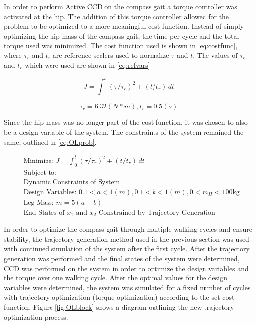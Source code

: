 \documentclass{./springer/svjour3}
\begin{document}
In order to perform Active CCD on the compass gait a torque controller was activated at the hip. The addition of this torque controller allowed
for the problem to be optimized to a more meaningful cost function. Instead of simply optimizing the hip mass of the compass gait, the time per cycle 
and the total torque used was minimized. The cost function used is shown in \ref{eq:costfunc}, where $\tau_r$ and $t_r$ are reference scalers used 
to normalize $\tau$ and $t$. The values of $\tau_r$ and $t_r$ which were used are shown in \ref{eq:refvars}

\begin{equation}
\label{eq:costfunc}
J = 
\int_{0}^{t} (\tau / \tau_r)^2 + (t/t_r) \,dt 
\end{equation}

\begin{equation}
\label{eq:refvars}
\tau_r = 6.32 (N*m), 
t_r = 0.5 (s)
\end{equation}

Since the hip mass was no longer part of the cost function, it was chosen to also 
be a design variable of the system. The constraints of the system remained the same, outlined in \ref{eq:OLprob}.

\begin{equation}
\begin{aligned}
&\text{Minimize: } J = \int_{0}^{t} (\tau / \tau_r)^2 + (t/t_r) \,dt \\
&\text{Subject to:}\\
&\text{Dynamic Constraints of System}\\
&\text{Design Variables: } 0.1<a<1 (m), 0.1<b<1 (m), 0<m_H<100 \text{kg}\\
&\text{Leg Mass: } m = 5(a+b)\\
&\text{End States of $x_1$ and $x_2$ Constrained by Trajectory Generation}
\end{aligned}
\label{eq:OLprob}
\end{equation}

In order to optimize the compass gait through multiple walking cycles and ensure stability, the trajectory generation method used
in the previous section was used with continued simulation of the system after the first cycle.
After the trajectory generation was performed and the final states of the system were determined, CCD was performed on the system in order to
optimize the design variables and the torque over one walking cycle. After the optimal values for the design variables were determined, the system was 
simulated for a fixed number of cycles with trajectory optimization (torque optimization) according to the set cost function. Figure \ref{fig:OLblock}
shows a diagram outlining the new trajectory optimization process.
\end{document}
